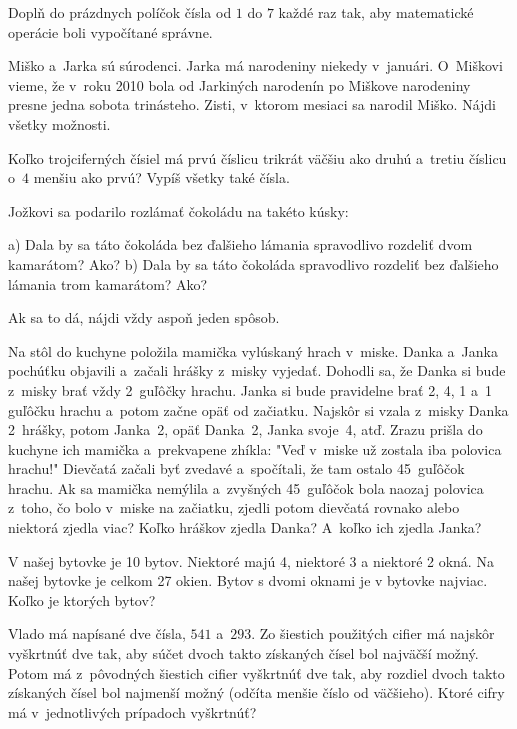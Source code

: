 ﻿{%
Doplň do prázdnych políčok čísla od $1$ do $7$ každé raz tak, aby matematické operácie boli vypočítané správne.
%
}

{%
Miško a~Jarka sú súrodenci. Jarka má narodeniny niekedy v~januári. O~Miškovi vieme, že v~roku 2010 bola od Jarkiných narodenín po Miškove narodeniny presne jedna sobota trinásteho. Zisti, v~ktorom mesiaci sa narodil Miško. Nájdi všetky možnosti.}

{%
Koľko trojciferných čísiel má prvú číslicu trikrát väčšiu ako druhú a~tretiu číslicu o~$4$ menšiu ako prvú? Vypíš všetky také čísla.}

{%
Jožkovi sa podarilo rozlámať čokoládu na takéto kúsky:
%

\ite a) Dala by sa táto čokoláda bez ďalšieho lámania spravodlivo rozdeliť dvom kamarátom? Ako?
\ite b) Dala by sa táto čokoláda spravodlivo rozdeliť bez ďalšieho lámania trom kamarátom? Ako?

Ak sa to dá, nájdi vždy aspoň jeden spôsob.
}

{%
Na stôl do kuchyne položila mamička vylúskaný hrach v~miske. Danka a~Janka pochúťku objavili a~začali hrášky z~misky vyjedať. Dohodli sa, že Danka si bude z~misky brať vždy 2~guľôčky hrachu. Janka si bude pravidelne brať 2, 4, 1 a~1 guľôčku hrachu a~potom začne opäť od začiatku. Najskôr si vzala z~misky Danka 2~hrášky, potom Janka~2, opäť Danka~2, Janka svoje~4, atď. Zrazu prišla do kuchyne ich mamička a~prekvapene zhíkla: "Veď v~miske už zostala iba polovica hrachu!" Dievčatá začali byť zvedavé a~spočítali, že tam ostalo 45~guľôčok hrachu. Ak sa mamička nemýlila a~zvyšných 45~guľôčok bola naozaj polovica z~toho, čo bolo v~miske na začiatku, zjedli potom dievčatá rovnako alebo niektorá zjedla viac? Koľko hráškov zjedla Danka? A~koľko ich zjedla Janka?}

{%
V našej bytovke je 10 bytov. Niektoré majú 4, niektoré 3 a niektoré 2 okná. Na našej bytovke je celkom 27 okien. Bytov s dvomi oknami je v bytovke najviac. Koľko je ktorých bytov?}

{%
Vlado má napísané dve čísla, $541$ a~$293$.
Zo šiestich použitých cifier má najskôr vyškrtnúť dve tak, aby súčet dvoch takto
získaných čísel bol najväčší možný.
Potom má z~pôvodných šiestich cifier vyškrtnúť dve tak, aby rozdiel dvoch takto
získaných čísel bol najmenší možný (odčíta menšie číslo od väčšieho).
Ktoré cifry má v~jednotlivých prípadoch vyškrtnúť?}

